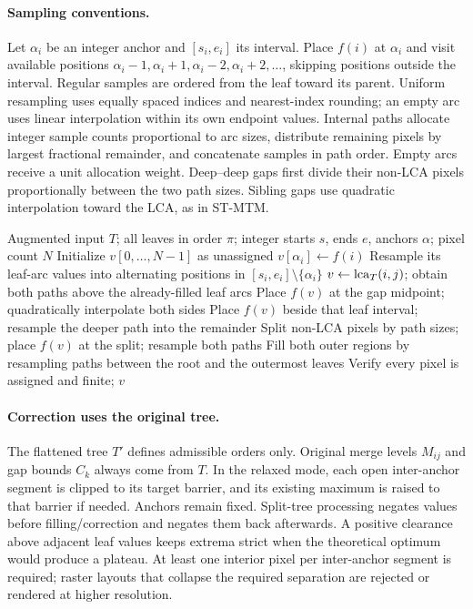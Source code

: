 \paragraph{Sampling conventions.}
Let $\alpha_i$ be an integer anchor and $[s_i,e_i]$ its interval. Place $f(i)$ at $\alpha_i$ and visit available positions $\alpha_i-1,\alpha_i+1,\alpha_i-2,\alpha_i+2,\ldots$, skipping positions outside the interval. Regular samples are ordered from the leaf toward its parent. Uniform resampling uses equally spaced indices and nearest-index rounding; an empty arc uses linear interpolation within its own endpoint values. Internal paths allocate integer sample counts proportional to arc sizes, distribute remaining pixels by largest fractional remainder, and concatenate samples in path order. Empty arcs receive a unit allocation weight. Deep--deep gaps first divide their non-LCA pixels proportionally between the two path sizes. Sibling gaps use quadratic interpolation toward the LCA, as in ST-MTM.

\begin{algorithm}[H]
\caption{FullDomainFill: initial scalar column from the augmented input.}\label{alg:full_filling}
\begin{algorithmic}[1]
\Require Augmented input $T$; all leaves in order $\pi$; integer starts $s$, ends $e$, anchors $\alpha$; pixel count $N$
\State Initialize $v[0,\ldots,N-1]$ as unassigned
  \State $v[\alpha_i]\gets f(i)$
  \State Resample its leaf-arc values into alternating positions in $[s_i,e_i]\setminus\{\alpha_i\}$
\EndFor
{}
  \State $v\gets\mathrm{lca}_T(i,j)$; obtain both paths above the already-filled leaf arcs
    \State Place $f(v)$ at the gap midpoint; quadratically interpolate both sides
    \State Place $f(v)$ beside that leaf interval; resample the deeper path into the remainder
  \Else
    \State Split non-LCA pixels by path sizes; place $f(v)$ at the split; resample both paths
  \EndIf
\EndFor
\State Fill both outer regions by resampling paths between the root and the outermost leaves
\State Verify every pixel is assigned and finite; \Return $v$
\end{algorithmic}
\end{algorithm}

\paragraph{Correction uses the original tree.}
The flattened tree $T'$ defines admissible orders only. Original merge levels $M_{ij}$ and gap bounds $C_k$ always come from $T$. In the relaxed mode, each open inter-anchor segment is clipped to its target barrier, and its existing maximum is raised to that barrier if needed. Anchors remain fixed. Split-tree processing negates values before filling/correction and negates them back afterwards. A positive clearance above adjacent leaf values keeps extrema strict when the theoretical optimum would produce a plateau. At least one interior pixel per inter-anchor segment is required; raster layouts that collapse the required separation are rejected or rendered at higher resolution.

